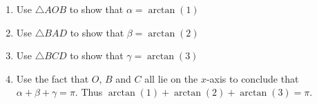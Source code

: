 \documentclass{ximera}
\begin{document}
\begin{problem}
\begin{enumerate}
\item Use $\triangle AOB$ to show that $\alpha = \arctan(1)$
\item Use $\triangle BAD$ to show that $\beta = \arctan(2)$
\item Use $\triangle BCD$ to show that $\gamma = \arctan(3)$

\item Use the fact that $O$, $B$ and $C$ all lie on the $x$-axis to conclude that $\alpha + \beta + \gamma = \pi$.  Thus $\arctan(1) + \arctan(2) + \arctan(3) = \pi$.

\end{enumerate}

\end{problem}
\end{document}
